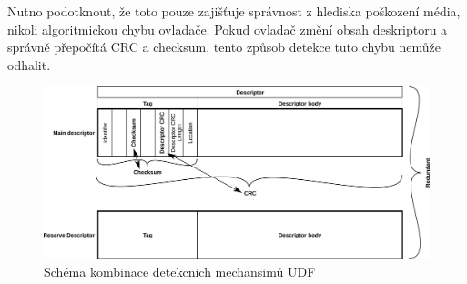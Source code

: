 Nutno podotknout, že toto pouze zajišťuje správnost z hlediska poškození média, nikoli algoritmickou chybu ovladače. Pokud ovladač změní obsah deskriptoru a správně přepočítá CRC a checksum, tento způsob detekce tuto chybu nemůže odhalit.
\begin{figure}[] 
    \centering
    \includegraphics[scale=0.65]{obrazky/det-chyb.png}
    \caption{Schéma kombinace detekcnich mechansimů UDF}
    \label{fig:detch}
\end{figure}

